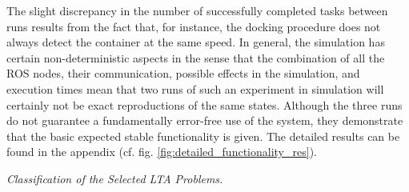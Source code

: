 \documentclass[english, master, utf8]{base/thesis_KBS}
\begin{document}
The slight discrepancy in the number of successfully completed tasks between runs results from the fact that, for instance, the docking procedure does not always detect the container
at the same speed. In general, the simulation has certain non-deterministic aspects in the sense that the combination of all the ROS nodes, their communication, possible effects in
the simulation, and execution times mean that two runs of such an experiment in simulation will certainly not be exact reproductions of the same states. Although the three runs do not
guarantee a fundamentally error-free use of the system, they demonstrate that the basic expected stable functionality is given.
The detailed results can be found in the appendix (cf. fig. \ref{fig:detailed_functionality_res}).\newline

\textit{Classification of the Selected LTA Problems.}\newline
\end{document}
